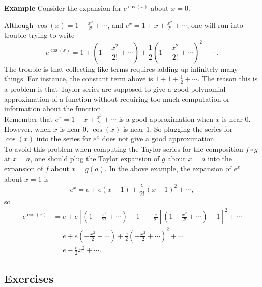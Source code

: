 \documentclass[twoside,openright,titlepage,a4paper]{book}
\begin{document}
\begin{sloppypar}
\textbf{Example} Consider the expansion for $e^{\cos(x)}$ about $x=0$.
\begin{examplebox}
Although $\cos(x) = 1-\frac{x^2}{2!} +\dotsb$, and $e^x = 1+x+\frac{x^2}{2!}+\dotsb$, one will run into trouble trying to write
\begin{equation*}
e^{\cos(x)} = 1+(1-\frac{x^2}{2!} +\dotsb) + \frac{1}{2}(1-\frac{x^2}{2!} +\dotsb)^2 + \dotsb.
\end{equation*}
The trouble is that collecting like terms requires adding up infinitely many things. For instance, the constant term above is $1+1+\frac{1}{2}+\dotsb$. The reason this is a problem is that Taylor series are supposed to give a good polynomial approximation of a function without requiring too much computation or information about the function.\\
Remember that $e^x = 1+x+\frac{x^2}{2}+\dotsb$ is a good approximation when $x$ is near 0. However, when $x$ is near 0, $\cos(x)$ is near 1. So plugging the series for $\cos(x)$ into the series for $e^x$ does not give a good approximation. \\
To avoid this problem when computing the Taylor series for the composition $f \circ g$ at $x=a$, one should plug the Taylor expansion of $g$ about $x=a$ into the expansion of $f$ about $x=g(a)$. In the above example, the expansion of $e^x$ about $x=1$ is
\begin{equation*}
e^x = e + e(x-1) + \frac{e}{2!}(x-1)^2 + \dotsb,
\end{equation*}
so
\begin{align*}
e^{\cos(x)} &= e + e\left[\left(1-\frac{x^2}{2!}+\dotsb\right)-1\right] + \frac{e}{2!}\left[\left(1-\frac{x^2}{2!}+\dotsb\right)-1\right]^2 + \dotsb \\
&= e + e(-\frac{x^2}{2} + \dotsb) + \frac{e}{2}(-\frac{x^2}{2}+\dotsb)^2 + \dotsb \\
&= e - \frac{e}{2}x^2 + \dotsb.
\end{align*}
\end{examplebox}
	
\subsection{Exercises}


\end{sloppypar}
\end{document}
